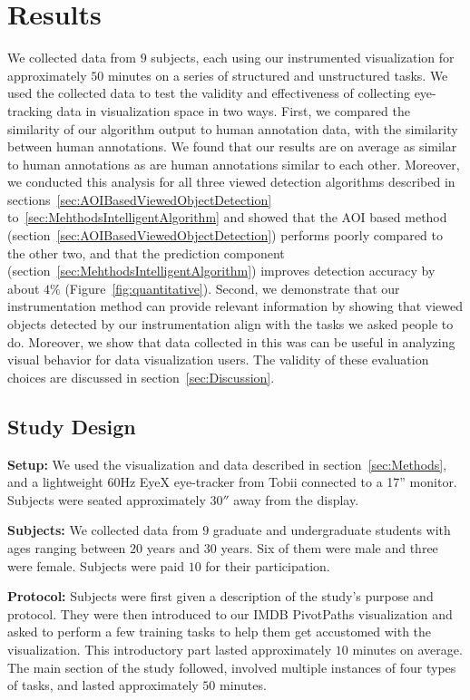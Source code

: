 \section{Results}
\label{sec:Evaluation}
We collected data from $9$ subjects, each using our instrumented visualization for approximately $50$ minutes on a series of structured and unstructured tasks. We used the collected data to test the validity and effectiveness of collecting eye-tracking data in visualization space in two ways. 
First, we compared the similarity of our algorithm output to human annotation data, with the similarity between human annotations. We found that our results are on average as similar to human annotations as are human annotations similar to each other. Moreover, we conducted this analysis for all three viewed detection algorithms described in sections~\ref{sec:AOIBasedViewedObjectDetection} to~\ref{sec:MehthodsIntelligentAlgorithm} and showed that the AOI based method (section~\ref{sec:AOIBasedViewedObjectDetection}) performs poorly compared to the other two, and that the prediction component (section~\ref{sec:MehthodsIntelligentAlgorithm}) improves detection accuracy by about $4\%$  (Figure~\ref{fig:quantitative}). 
Second, we demonstrate that our instrumentation method can provide relevant information by showing that viewed objects detected by our instrumentation align with the tasks we asked people to do. Moreover, we show that data collected in this was can be useful in analyzing visual behavior for data visualization users.  
The validity of these evaluation choices are discussed in section~\ref{sec:Discussion}.

\subsection{Study Design }
\label{sec:EvalStudyDesign}

\textbf{Setup: } We used the visualization and data described in section~\ref{sec:Methods}, and a lightweight $60$Hz EyeX eye-tracker from Tobii connected to a 17'' monitor. Subjects were seated approximately $30''$ away from the display. 

\textbf{Subjects:} We collected data from $9$ graduate and undergraduate students with ages ranging between $20$ years and $30$ years. Six of them were male and three were female. Subjects were paid $10$ for their participation. 

\textbf{Protocol:} Subjects were first given a description of the study's purpose and protocol. They were then introduced to our IMDB PivotPaths visualization and asked to perform a few training tasks to help them get accustomed with the visualization. This introductory part lasted approximately $10$ minutes on average. The main section of the study followed, involved multiple instances of four types of tasks, and lasted approximately $50$ minutes. 


